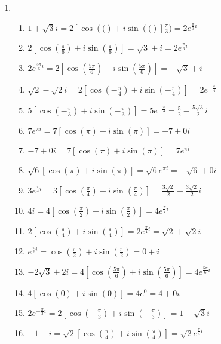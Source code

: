 \documentclass[a4paper]{article}
\newcommand{\exercise}{\item}
\newcommand{\df}[2]{\displaystyle\frac{#1}{#2}}
\newcommand{\cis}[1]{\left[\cos\left({#1}\right)+i\sin\left({#1}\right)\right]}
\begin{document}
\begin{enumerate}
\begin{enumerate} [label=(\alph*)]
		\item $|-5i|=5$, ~$\arg(-5i)=-\df{\pi}{2}=-90^{\circ}$
		\item $|-\sqrt{2}|=\sqrt{2}$, ~$\arg(-\sqrt{2})=\pi=180^{\circ}$
		\item $|4i+2|=2\sqrt{5}$, ~$\arg(4i+2) \simeq 63.44^{\circ}$
		\item $|1+\sqrt{2}|=1+\sqrt{2}\simeq 2.4142$, ~$\arg(1+\sqrt{2}) = 0^{\circ}$
		\item $\left|-\df{1}{2}+\df{3}{4}i\right|=\df{\sqrt{13}}{4}$, ~$\arg\left(-\df{1}{2}+\df{3}{4}i\right) \simeq 123.69^{\circ}$
		\item $|i-4|=\sqrt{17}$, ~$\arg(i-4) \simeq 165.96^{\circ}$
		\item $|1+\sqrt{2}-\sqrt{3}i|=\sqrt{6+\sqrt{8}} \simeq 2.9713$, ~$\arg(1+\sqrt{2}-\sqrt{3}i) \simeq -35.657^{\circ}$
\end{enumerate}\exercise\begin{enumerate} [label=(\alph*)]		\item $1+\sqrt{3}i=2\cis(\df{\pi}{3})=2e^{\frac{\pi}{3}i}$ 
		\item $2 \cis{\df{\pi}{6}}= \sqrt{3}+i= 2e^{\frac{\pi}{6}i}$
		\item $2e^{\frac{5\pi}{6}i}=2\cis{\df{5\pi}{6}}=-\sqrt{3}+i$
		\item $\sqrt{2}-\sqrt{2}i=2\cis{-\df{\pi}{4}}=2e^{-\frac{\pi}{4}}$
		\item $5 \cis{-\df{\pi}{3}}=5e^{-\frac{\pi}{3}}=\df{5}{2}-\df{5\sqrt{3}}{2}i$
		\item $7e^{\pi i}=7\cis{\pi}=-7+0i$
		\item $-7+0i=7\cis{\pi}=7e^{\pi i}$
		\item $\sqrt{6}\cis{\pi}=\sqrt{6}e^{\pi i}=-\sqrt{6}+0i$
		\item $3e^{\frac{\pi}{4}i}=3\cis{\df{\pi}{4}}=\df{3\sqrt{2}}{2}+\df{3\sqrt{2}}{2}i$
		\item $4i=4\cis{\df{\pi}{2}}=4e^{\df{\pi}{2}i}$
		\item $2\cis{\df{\pi}{4}}=2e^{\frac{\pi}{4}i}=\sqrt{2}+\sqrt{2}i$
		\item $e^{\frac{\pi}{2}i}=\cos\left(\df{\pi}{2}\right)+i\sin\left(\df{\pi}{2}\right)=0+i$
		\item $-2\sqrt{3}+2i=4\cis{\df{5\pi}{6}}=4e^{\frac{5\pi}{6}i}$
		\item $4\cis{0}=4e^{0}=4+0i$
		\item $2e^{-\frac{\pi}{3}i}=2\cis{-\df{\pi}{3}}=1-\sqrt{3}i$
		\item $-1-i=\sqrt{2}\cis{\df{\pi}{4}}=\sqrt{2}e^{\frac{\pi}{4}i}$

\end{enumerate}
\end{enumerate}
\end{document}

